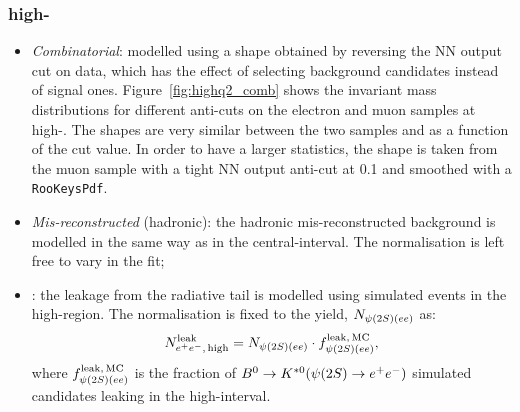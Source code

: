 \subsubsection*{\BdToKstee high-\qsq}
%
\begin{itemize}

\item \textit{Combinatorial}: modelled using a shape obtained by reversing the NN output cut on data,
which has the effect of selecting background candidates instead of signal ones.
Figure~\ref{fig:highq2_comb} shows the invariant mass distributions for different anti-cuts on the electron 
and muon samples at high-\qsq. The shapes are very similar between the two samples and as a function 
of the cut value. In order to have a larger statistics, the shape is taken from the muon sample with a tight
NN output anti-cut at 0.1 and smoothed with a \texttt{RooKeysPdf}.

\item \textit{Mis-reconstructed} (hadronic): the hadronic mis-reconstructed background is modelled in 
the same way as in the central-\qsq interval. The normalisation is left free to vary in the fit;

\item \BdToKstPsiee: the leakage from the \psitwos radiative tail is modelled using simulated 
\BdToKstPsiee events in the high-\qsq region. The normalisation is fixed to 
the \BdToKstPsiee yield, $N_{\psitwos(ee)}$ as:
%
$$N_{\ee, \, {\rm high}}^{\rm leak} = N_{\psitwos(ee)} \cdot f_{\psitwos(ee)}^{\rm leak, \,MC},$$
%
where $f_{\psitwos(ee)}^{\rm leak, \,MC}$ is the fraction of $\Bd\to\Kstarz(\psitwos\to\ee)$ simulated candidates
leaking in the high-\qsq interval.

\end{itemize}

